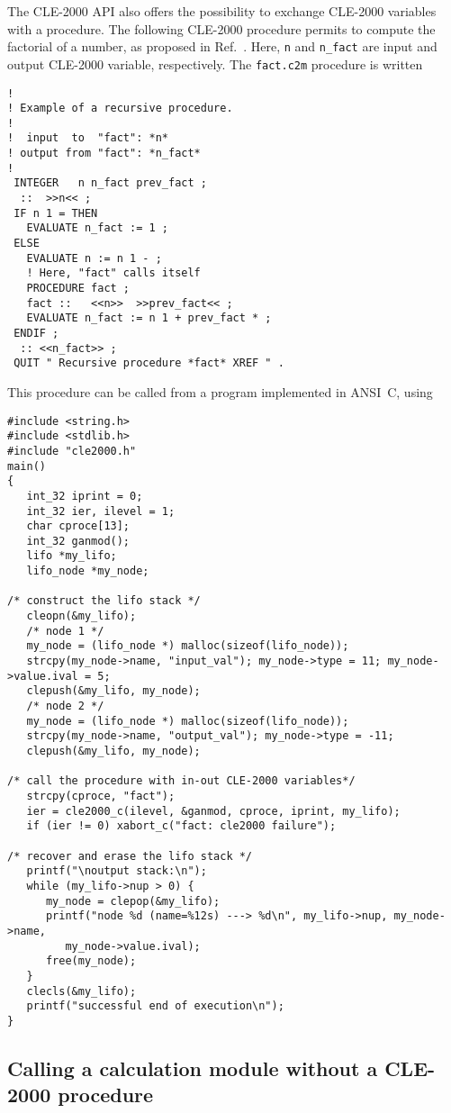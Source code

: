 The CLE-2000 API also offers the possibility to exchange CLE-2000 variables with a procedure. The following CLE-2000 procedure
permits to compute the factorial of a number, as proposed in Ref.~. Here, {\tt n} and {\tt n\_fact} are input and
output CLE-2000 variable, respectively. The {\tt fact.c2m} procedure is written
\begin{verbatim}
!
! Example of a recursive procedure.
!
!  input  to  "fact": *n*
! output from "fact": *n_fact*
!
 INTEGER   n n_fact prev_fact ;
  ::  >>n<< ;
 IF n 1 = THEN
   EVALUATE n_fact := 1 ;
 ELSE
   EVALUATE n := n 1 - ;
   ! Here, "fact" calls itself
   PROCEDURE fact ;
   fact ::   <<n>>  >>prev_fact<< ;
   EVALUATE n_fact := n 1 + prev_fact * ;
 ENDIF ;
  :: <<n_fact>> ;
 QUIT " Recursive procedure *fact* XREF " .
\end{verbatim}

This procedure can be called from a program implemented in ANSI~C, using
\begin{verbatim}
#include <string.h>
#include <stdlib.h>
#include "cle2000.h"
main()
{
   int_32 iprint = 0;
   int_32 ier, ilevel = 1;
   char cproce[13];
   int_32 ganmod();
   lifo *my_lifo;
   lifo_node *my_node;

/* construct the lifo stack */
   cleopn(&my_lifo);
   /* node 1 */
   my_node = (lifo_node *) malloc(sizeof(lifo_node));
   strcpy(my_node->name, "input_val"); my_node->type = 11; my_node->value.ival = 5;
   clepush(&my_lifo, my_node);
   /* node 2 */
   my_node = (lifo_node *) malloc(sizeof(lifo_node));
   strcpy(my_node->name, "output_val"); my_node->type = -11;
   clepush(&my_lifo, my_node);

/* call the procedure with in-out CLE-2000 variables*/
   strcpy(cproce, "fact");
   ier = cle2000_c(ilevel, &ganmod, cproce, iprint, my_lifo);
   if (ier != 0) xabort_c("fact: cle2000 failure");

/* recover and erase the lifo stack */
   printf("\noutput stack:\n");
   while (my_lifo->nup > 0) {
      my_node = clepop(&my_lifo);
      printf("node %d (name=%12s) ---> %d\n", my_lifo->nup, my_node->name,
         my_node->value.ival);
      free(my_node);
   }
   clecls(&my_lifo);
   printf("successful end of execution\n");
}
\end{verbatim}

\vskip 0.8cm

\subsection {Calling a calculation module without a CLE-2000 procedure}

